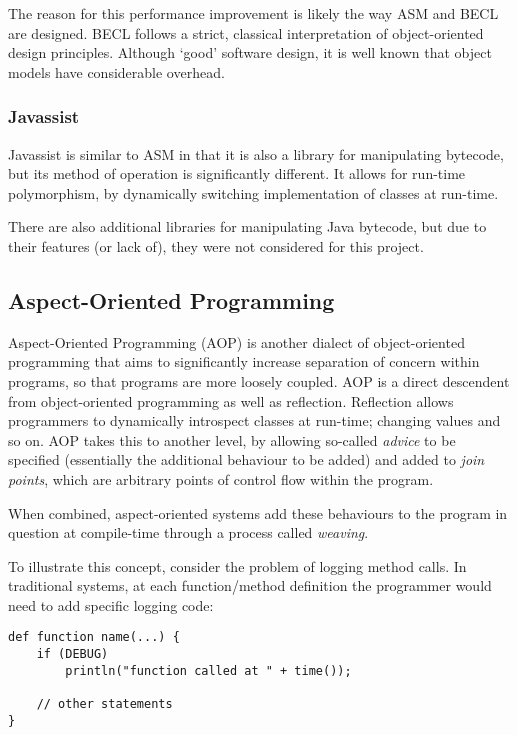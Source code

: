                 The reason for this performance improvement is likely the way ASM and BECL are designed. BECL follows a strict, classical interpretation of object-oriented design principles. Although `good' software design, it is well known that object models have considerable overhead.

                \subsubsection{Javassist} \label{sec:instrumentation/alt-instr/bytecode-instr/javassist}
                Javassist \citep{Chiba1998} is similar to ASM in that it is also a library for manipulating bytecode, but its method of operation is significantly different. It allows for run-time polymorphism, by dynamically switching implementation of classes at run-time.

                There are also additional libraries for manipulating Java bytecode, but due to their features (or lack of), they were not considered for this project.

        \subsection{Aspect-Oriented Programming} \label{sec:instrumentation/alt-instr/aop}
        Aspect-Oriented Programming (AOP) \citep{Kiczales1997} is another dialect of object-oriented programming that aims to significantly increase separation of concern within programs, so that programs are more loosely coupled. AOP is a direct descendent from object-oriented programming as well as reflection. Reflection allows programmers to dynamically introspect classes at run-time; changing values and so on. AOP takes this to another level, by allowing so-called \textit{advice} to be specified (essentially the additional behaviour to be added) and added to \textit{join points}, which are arbitrary points of control flow within the program.

        When combined, aspect-oriented systems add these behaviours to the program in question at compile-time through a process called \textit{weaving}.

        To illustrate this concept, consider the problem of logging method calls. In traditional systems, at each function/method definition the programmer would need to add specific logging code:

        \begin{lstlisting}[caption=Traditional use of advice in programs,label=lst:tradadvice]
def function name(...) {
    if (DEBUG)
        println("function called at " + time());

    // other statements
}\end{lstlisting}

